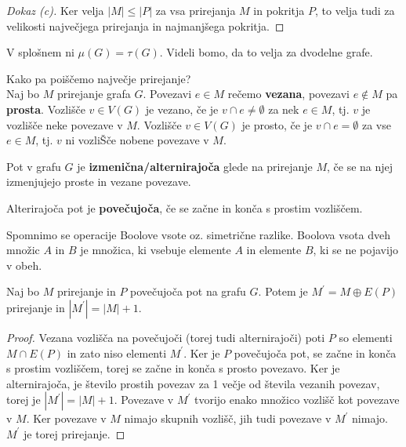 \documentclass[11pt, a4paper]{article}
\begin{document}
    \begin{proof}[Dokaz \emph{(c)}]
        Ker velja \(|M| \le |P|\) za vsa prirejanja \(M\) in pokritja \(P\), to velja tudi za velikosti največjega prirejanja in najmanjšega pokritja. 
    \end{proof}

    \begin{remark}
        V splošnem ni \(\mu(G) = \tau(G)\). Videli bomo, da to velja za dvodelne grafe.
    \end{remark}

    Kako pa poiščemo največje prirejanje? \\
    
    Naj bo \(M\) prirejanje grafa \(G\). Povezavi \(e \in M\) rečemo \textbf{vezana}, povezavi \(e \notin M\) pa \textbf{prosta}. Vozlišče \(v \in V(G)\) je vezano, če je \(v \cap e \neq \emptyset\) za nek \(e \in M\), tj. \(v\) je vozlišče neke povezave v \(M\). Vozlišče \(v \in V(G)\) je prosto, če je \(v \cap e = \emptyset\) za vse \(e \in M\), tj. \(v\) ni vozliŠče nobene povezave v \(M\).
    
    \begin{definition}
        Pot v grafu \(G\) je \textbf{izmenična/alternirajoča} glede na prirejanje \(M\), če se na njej izmenjujejo proste in vezane povezave.
    \end{definition}

    \begin{definition}
        Alterirajoča pot je \textbf{povečujoča}, če se začne in konča s prostim vozliščem.
    \end{definition}

    Spomnimo se operacije Boolove vsote oz. simetrične razlike. Boolova vsota dveh množic \(A\) in \(B\) je množica, ki vsebuje elemente \(A\) in elemente \(B\), ki se ne pojavijo v obeh.

    \begin{proposition}
        Naj bo \(M\) prirejanje in \(P\) povečujoča pot na grafu \(G\). Potem je \(M^\prime = M \oplus E(P)\) prirejanje in \(|M^\prime| = |M|+1\). 
    \end{proposition}

    \begin{proof}
        Vezana vozlišča na povečujoči (torej tudi alternirajoči) poti \(P\) so elementi \(M \cap E(P)\) in zato niso elementi \(M^\prime\). Ker je \(P\) povečujoča pot, se začne in konča s prostim vozliščem, torej se začne in konča s prosto povezavo. Ker je alternirajoča, je število prostih povezav za 1 večje od števila vezanih povezav, torej je \(|M^\prime| = |M|+1\). Povezave v \(M^\prime\) tvorijo enako množico vozlišč kot povezave v \(M\). Ker povezave v \(M\) nimajo skupnih vozlišč, jih tudi povezave v \(M^\prime\) nimajo. \(M^\prime\) je torej prirejanje.
    \end{proof}
\end{document}
